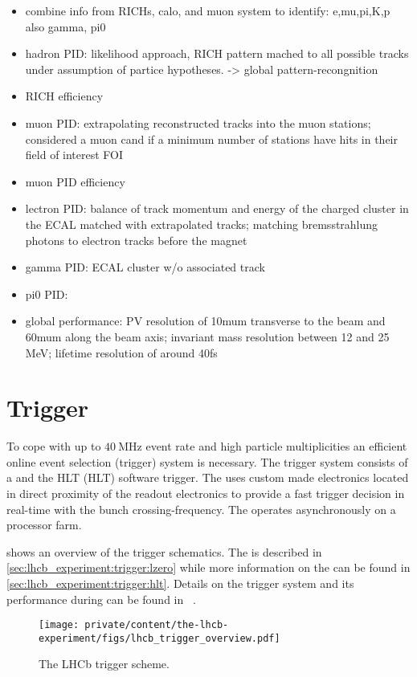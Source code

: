 \begin{itemize}
  \item combine info from RICHs, calo, and muon system to identify: e,mu,pi,K,p also gamma, pi0
  \item hadron PID: likelihood approach, RICH pattern mached to all possible tracks under assumption of partice hypotheses. -> global pattern-recongnition
  \item RICH efficiency
  \item muon PID: extrapolating reconstructed tracks into the muon stations; considered a muon cand if a minimum number of stations have hits in their field of interest FOI
  \item muon PID efficiency
  \item lectron PID: balance of track momentum and energy of the charged cluster in the ECAL matched with extrapolated tracks; matching bremsstrahlung photons to electron tracks before the magnet
  \item gamma PID: ECAL cluster w/o associated track
  \item pi0 PID: 
  \item global performance: PV resolution of 10mum transverse to the beam and 60mum along the beam axis; invariant mass resolution between 12 and 25 MeV; lifetime resolution of around 40fs
\end{itemize}

\section{Trigger}
\label{sec:lhcb_experiment:trigger}

To cope with up to $\SI{40}{\mega\hertz}$ event rate and high particle
multiplicities an efficient online event selection (trigger) system is
necessary. The \LHCb trigger system consists of a \LZero and the \acs{HLT}
(\acl{HLT}) software trigger. The \LZero uses custom made electronics located in
direct proximity of the readout electronics to provide a fast trigger decision
in real-time with the bunch crossing-frequency. The \HLT operates asynchronously
on a processor farm.

 shows an overview of the \LHCb
trigger schematics. The \LZero is described in
\cref{sec:lhcb_experiment:trigger:lzero} while more information on the \HLT can
be found in \cref{sec:lhcb_experiment:trigger:hlt}. Details on the \LHCb trigger
system and its performance during \RunOne can be found in
\Refs~\cite{Aaij:2012me,Albrecht:2013fba}.
%
\begin{figure}[t]
  \centering
  \texttt{[image: private/content/the-lhcb-experiment/figs/lhcb\_trigger\_overview.pdf]}
  \caption{
    The \acs{LHCb} \RunOne trigger scheme.
  }
  \label{fig:lhcb_experiment:trigger:overview}
\end{figure}

